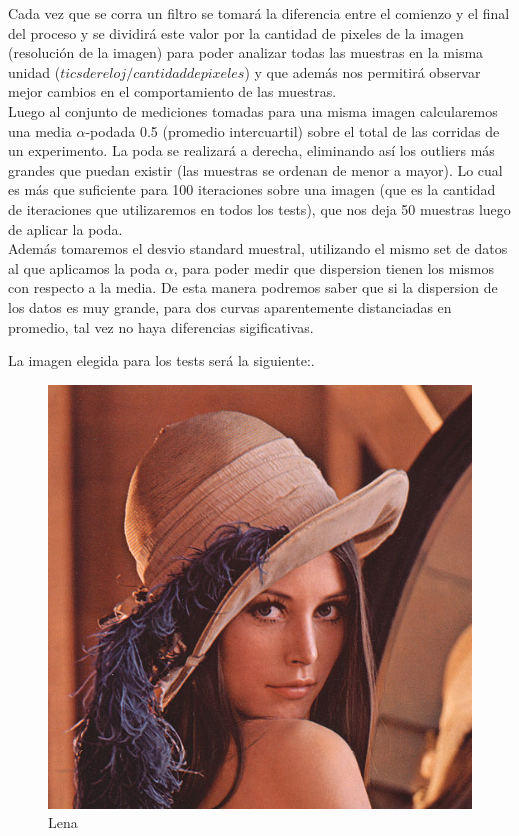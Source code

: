 Cada vez que se corra un filtro se tomará la diferencia entre el comienzo y el final del proceso y se dividirá este valor por la cantidad de pixeles de la imagen (resolución de la imagen) para poder analizar todas las muestras en la misma unidad ($tics de reloj /cantidad de pixeles$) y que además nos permitirá observar mejor cambios en el comportamiento de las muestras.\\

Luego al conjunto de mediciones tomadas para una misma imagen calcularemos una media $\alpha$-podada 0.5 (promedio intercuartil) sobre el total de las corridas de un experimento. La poda se realizará a derecha, eliminando así los outliers más grandes que puedan existir (las muestras se ordenan de menor a mayor). Lo cual es más que suficiente para 100 iteraciones sobre una imagen (que es la cantidad de iteraciones que utilizaremos en todos los tests), que nos deja 50 muestras luego de aplicar la poda. \\ 
Además tomaremos el desvio standard muestral, utilizando el mismo set de datos al que aplicamos la poda $\alpha$, para poder medir que dispersion tienen los mismos con respecto a la media. 
De esta manera podremos saber que si la dispersion de los datos es muy grande, para dos curvas aparentemente distanciadas en promedio, tal vez no haya diferencias sigificativas.

La imagen elegida para los tests será la siguiente:.

\newpage

\begin{figure}
  \begin{center}
	\includegraphics[scale=.5]{imagenes/lena32.jpg}
	\caption{Lena}
	\label{lena}
  \end{center}
\end{figure}

